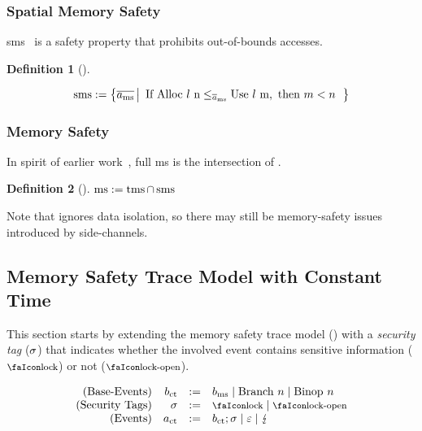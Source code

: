 \documentclass[dvipsnames,conference]{IEEEtran}
\theoremstyle{definition}
\newtheorem{definition}{Definition}[section]
\begin{document}
\subsubsection{Spatial Memory Safety}

\gls*{sms}~\cite{nagarakatte2009soft} is a safety property that prohibits out-of-bounds accesses.

\begin{definition}[]\label{def:trace:smsdef}

  \noindent
  \[
  \smssafe:=\left\{\trace[_{\mssafe}] \left|\begin{array}{rcl}
      \text{If }\ev{Alloc\ \loc\ n}\le_{\trace_{\mssafe}}\ev{Use\ \loc\ m}, \text{ then }m<n
  \end{array}\right.\right\}
  \]
\end{definition}

\subsubsection{Memory Safety}

In spirit of earlier work~\cite{nagarakatte2009soft,nagarakatte2010cets,jim2002cyclone,necula2005ccured,michael2023mswasm}, full \gls*{ms} is the intersection of .

\begin{definition}[]\label{def:trace:msdef}
  $
  \operatorname{ms}:=\operatorname{tms} \cap \operatorname{sms}
  $
\end{definition}

Note that  ignores data isolation, so there may still be memory-safety issues introduced by side-channels.

\subsection{Memory Safety Trace Model with Constant Time}\label{subsec:scct:tracemodel}

This section starts by extending the memory safety trace model () with a {\em security tag} ($\sigma$) that indicates whether the involved event contains sensitive information ($\lock$) or not ($\unlock$).

\vspace{-.5em}
\[
  \begin{array}{rrcl}
    (\text{Base-Events}) & \preevent[_{\ctsafe}] &:=& \preevent[_{\mssafe}] \mid \ev{Branch\ }n \mid \ev{Binop\ }n\\
    (\text{Security Tags}) & \securitytag &:=& \lock \mid \unlock\\ 
    (\text{Events}) & \event[_{\ctsafe}] &:=& \preevent[_{\ctsafe}];\securitytag \mid \emptyevent \mid \lightning \\ 
  \end{array}
\]
\end{document}
